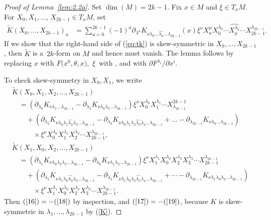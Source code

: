 \documentclass[10pt,a4paper]{amsart}
\numberwithin{equation}{section}
\theoremstyle{definition}
\newcommand{\bm}{ M}
\begin{document}
\begin{proof}[Proof of Lemma~\ref{lem:2.2a}]
Set $\dim (M) = 2k-1. $ Fix
 $x\in \bm$ and $\xi\in T_x\bm$.
 For $X_0, X_1,\dots$, $ X_{2k-1}\in T_x\bm$, set
 \begin{align}\label{eq:tk}\tilde K(X_0,\dots, X_{2k-1})_x
&=
\sum_{a=0}^{2k-1} (-1)^a\partial_{\lambda^\mu} K_{\nu \lambda_0 \dots \widehat{\lambda_a}\dots\lambda_{2k-1}}
(x)\xi^\nu
X_a^{\mu} X_0^{\lambda_0}\cdots \widehat{X_\mu^{\lambda_a}} \cdots X_{2k-1}^{\lambda_{2k-1}}.
\end{align}
If we show that the right-hand side of (\ref{eq:tk}) is skew-symmetric in $X_0,\dots, X_{2k-1}$, then
$\tilde K
$ is a~$2k$-form on $\bm$ and hence must vanish. The lemma follows by replacing $x$ with
$F\bigl(x^0,\theta,x\bigr)$,~$\xi$~with , and  with $\partial F^{\lambda_i}/\partial x^i$.

To check skew-symmetry in $X_0, X_1$, we write
\begin{gather}
{\tilde{K}(X_0,X_1, X_2,\dots, X_{2k-1})
}\nonumber\\
\quad{}= (\partial_{\lambda_0} K_{\nu \lambda_1\dots \lambda_{2k-1}}
- \partial_{\lambda_1} K_{\nu \lambda_0 \lambda_2 \dots\lambda_{2k-1}})
\xi^\nu
X_0^{\lambda_0} X_1^{\lambda_1} \cdots X^{2k-1}_{\lambda_{2k-1}}
\label{16}\\
\qquad{}+ (\partial_{\lambda_2} K_{\nu \lambda_0 \lambda_1 \widehat{\lambda_2} \lambda_3\dots \lambda_{2k-1}}
-\partial_{\lambda_3} K_{\nu \lambda_0 \lambda_1 \lambda_2\widehat{\lambda_3}\lambda_4\dots \lambda_{2k-1}}
+\dots - \partial_{\lambda_{2k-1}}K_{\nu\lambda_0\dots\lambda_{2k-1}})\nonumber\\
\qquad\quad{} \times \xi^\nu X_0^{\lambda_0} X_1^{\lambda_1} X_2^{\lambda_2}\cdots X_{2k-1}^{\lambda_{2k-1}},\label{17}\\
{\tilde K(X_1,X_0, X_2, \dots,X_{2k-1}) }\nonumber\\
\quad{}= (\partial_{\lambda_1} K_{\nu \lambda_0\lambda_2\lambda_3\dots\lambda_{2k-1}}
- \partial_{\lambda_0} K_{\nu \lambda_1 \lambda_2\dots\lambda_{2k-1}}) \xi^\nu
X_1^{\lambda_1} X_0^{\lambda_0} X_2^{\lambda_2}X_3^{\lambda_3}\cdots X_{2k-1}^{\lambda_{2k-1}} \label{18}\\
\qquad{}+ (\partial_{\lambda_2} K_{\nu \lambda_1 \lambda_0 \widehat{\lambda_2} \lambda_3\dots \lambda_{2k-1}}
-\partial_{\lambda_3} K_{\nu \lambda_1 \lambda_0 \lambda_2\widehat{\lambda_3}\lambda_4\dots \lambda_{2k-1}}
+\cdots - \partial_{\lambda_{2k-1}}K_{\nu\lambda_1 \lambda_0 \lambda_2\dots\lambda_{2k-1}})\!\!\nonumber\\
\qquad\quad{} \times \xi^\nu X_1^{\lambda_1} X_0^{\lambda_0} X_2^{\lambda_2}X_3^{\lambda_3}\cdots X_{2k-1}^{\lambda_{2k-1}}.\label{19}
\end{gather}
Then $\text{(\ref{16})} = - \text{(\ref{18})}$ by inspection, and $\text{(\ref{17})} = - \text{(\ref{19})}$, because $K$ is skew-symmetric in $\lambda_1,\dots,\lambda_{2k-1}$ by (\ref{K}).


\end{proof}
\end{document}
